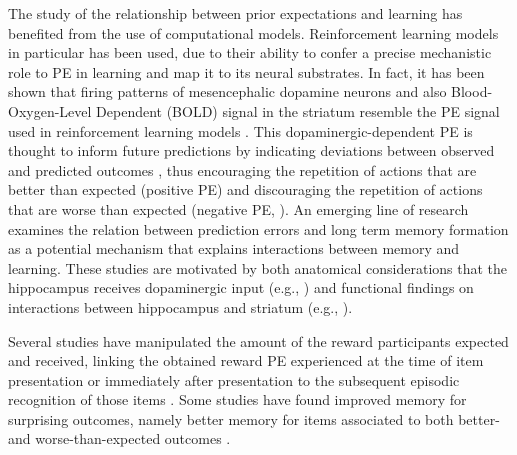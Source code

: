 \documentclass[a4paper,12pt]{article}
\begin{document}
The study of the relationship between prior expectations and learning has benefited from the use of computational models. Reinforcement learning models in particular has been used, due to their ability to confer a precise mechanistic role to PE in learning and map it to its neural substrates. In fact, it has been shown that firing patterns of mesencephalic dopamine neurons and also Blood-Oxygen-Level Dependent (BOLD) signal in the striatum resemble the PE signal used in reinforcement learning models \citep{Daw2011, McClure2003, Schultz1997}. This dopaminergic-dependent PE is thought to inform future predictions by indicating deviations between observed and predicted outcomes \citep{Daw2013, Niv2008, Rangel2008a, Rushworth2008}, thus encouraging the repetition of actions that are better than expected (positive PE) and discouraging the repetition of actions that are worse than expected (negative PE, \citealp{Schultz2016, Steinberg2013}). An emerging line of research examines the relation between prediction errors and long term memory formation as a potential mechanism that explains interactions between memory and learning. These studies are motivated by both anatomical considerations that the hippocampus receives dopaminergic input (e.g., \citealp{Lisman2005}) and functional findings on interactions between hippocampus and striatum (e.g., \citealp{Poldrack2001}). \par
Several studies have manipulated the amount of the reward participants expected and received, linking the obtained reward PE experienced at the time of item presentation or immediately after presentation to the subsequent episodic recognition of those items \citep{Rouhani2018,Rouhani2021, Jang2019, de2018signed}. Some studies have found improved memory for surprising outcomes, namely better memory for items associated to both better- and worse-than-expected outcomes \citep{Rouhani2018, Rouhani2021}.
\end{document}
